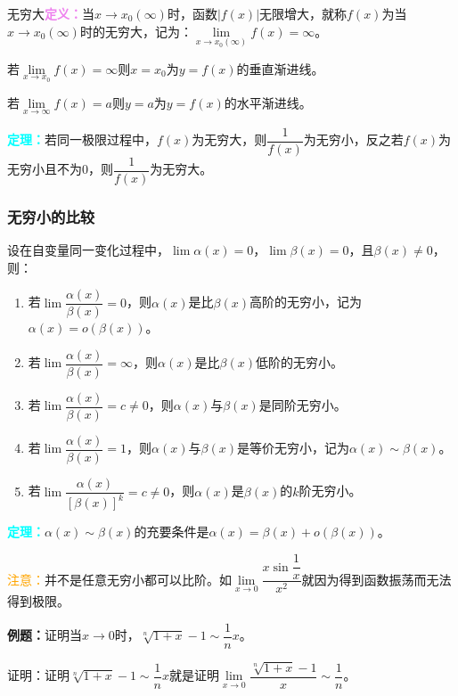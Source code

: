 \documentclass[UTF8, 12pt]{ctexart}
\begin{document}
        无穷大\textcolor{violet}{\textbf{定义：}}当$x\to x_0(\infty)$时，函数$\vert f(x)\vert$无限增大，就称$f(x)$为当$x\to x_0(\infty)$时的无穷大，记为：$\lim\limits_{x\to x_0(\infty)}f(x)=\infty$。

        若$\lim\limits_{x\to x_0}f(x)=\infty$则$x=x_0$为$y=f(x)$的垂直渐进线。

        若$\lim\limits_{x\to\infty}f(x)=a$则$y=a$为$y=f(x)$的水平渐进线。

        \textcolor{aqua}{\textbf{定理：}}若同一极限过程中，$f(x)$为无穷大，则$\dfrac{1}{f(x)}$为无穷小，反之若$f(x)$为无穷小且不为0，则$\dfrac{1}{f(x)}$为无穷大。

        \subsubsection{无穷小的比较}

        设在自变量同一变化过程中，$\lim\alpha(x)=0$，$\lim\beta(x)=0$，且$\beta(x)\neq 0$，则：

        \begin{enumerate}
            \item 若$\lim\dfrac{\alpha(x)}{\beta(x)}=0$，则$\alpha(x)$是比$\beta(x)$高阶的无穷小，记为$\alpha(x)=o(\beta(x))$。
            \item 若$\lim\dfrac{\alpha(x)}{\beta(x)}=\infty$，则$\alpha(x)$是比$\beta(x)$低阶的无穷小。
            \item 若$\lim\dfrac{\alpha(x)}{\beta(x)}=c\neq 0$，则$\alpha(x)$与$\beta(x)$是同阶无穷小。
            \item 若$\lim\dfrac{\alpha(x)}{\beta(x)}=1$，则$\alpha(x)$与$\beta(x)$是等价无穷小，记为$\alpha(x)\sim\beta(x)$。
            \item 若$\lim\dfrac{\alpha(x)}{[\beta(x)]^k}=c\neq 0$，则$\alpha(x)$是$\beta(x)$的$k$阶无穷小。
        \end{enumerate}

        \textcolor{aqua}{\textbf{定理：}}$\alpha(x)\sim\beta(x)$的充要条件是$\alpha(x)=\beta(x)+o(\beta(x))$。

        \textcolor{orange}{注意：}并不是任意无穷小都可以比阶。如$\lim\limits_{x\to 0}\dfrac{x\sin\dfrac{1}{x}}{x^2}$就因为得到函数振荡而无法得到极限。

        \textbf{例题：}证明当$x\to 0$时，$\sqrt[n]{1+x}-1\sim\dfrac{1}{n}x$。

        证明：证明$\sqrt[n]{1+x}-1\sim\dfrac{1}{n}x$就是证明$\lim\limits_{x\to 0}\dfrac{\sqrt[n]{1+x}-1}{x}\sim\dfrac{1}{n}$。
\end{document}
